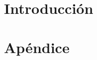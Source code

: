\documentclass[twoside, 12pt]{article}
\begin{document}
 
\section{Introducción}
 
 
\section{Apéndice}
 
\end{document}
